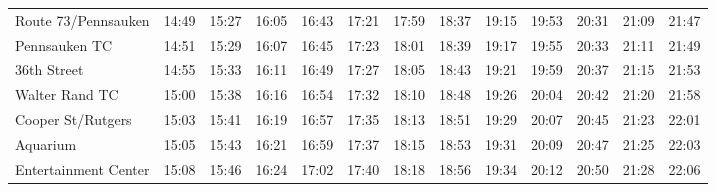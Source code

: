 \begin{center}
\begin{tabular}{@{}lrrrrrrrrrrrr@{}}
Route 73/Pennsauken & 14:49 & 15:27 & 16:05 & 16:43 & 17:21 & 17:59 & 18:37 & 19:15 & 19:53 & 20:31 & 21:09 & 21:47 \\
Pennsauken TC & 14:51 & 15:29 & 16:07 & 16:45 & 17:23 & 18:01 & 18:39 & 19:17 & 19:55 & 20:33 & 21:11 & 21:49 \\
36th Street & 14:55 & 15:33 & 16:11 & 16:49 & 17:27 & 18:05 & 18:43 & 19:21 & 19:59 & 20:37 & 21:15 & 21:53 \\
Walter Rand TC & 15:00 & 15:38 & 16:16 & 16:54 & 17:32 & 18:10 & 18:48 & 19:26 & 20:04 & 20:42 & 21:20 & 21:58 \\
Cooper St/Rutgers & 15:03 & 15:41 & 16:19 & 16:57 & 17:35 & 18:13 & 18:51 & 19:29 & 20:07 & 20:45 & 21:23 & 22:01 \\
Aquarium & 15:05 & 15:43 & 16:21 & 16:59 & 17:37 & 18:15 & 18:53 & 19:31 & 20:09 & 20:47 & 21:25 & 22:03 \\
Entertainment Center & 15:08 & 15:46 & 16:24 & 17:02 & 17:40 & 18:18 & 18:56 & 19:34 & 20:12 & 20:50 & 21:28 & 22:06 \\
\bottomrule\end{tabular}\end{center}